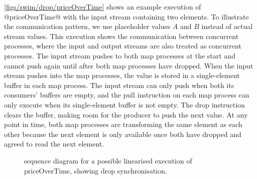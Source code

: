 \autoref{figs/swim/drop/priceOverTime} shows an example execution of @priceOverTime@ with the input stream containing two elements.
To illustrate the communication pattern, we use placeholder values $A$ and $B$ instead of actual stream values.
This execution shows the communication between concurrent processes, where the input and output streams are also treated as concurrent processes.
The input stream pushes to both map processes at the start and cannot push again until after both map processes have dropped.
When the input stream pushes into the map processes, the value is stored in a single-element buffer in each map process.
The input stream can only push when both its consumers' buffers are empty, and the pull instruction on each map process can only execute when its single-element buffer is not empty.
The drop instruction clears the buffer, making room for the producer to push the next value.
At any point in time, both map processes are transforming the same element as each other because the next element is only available once both have dropped and agreed to read the next element.

\begin{figure}
\center
\begin{sequencediagram}









\end{sequencediagram}
\caption{sequence diagram for a possible linearised execution of priceOverTime, showing drop synchronisation. }
\label{figs/swim/drop/priceOverTime}
\end{figure}


